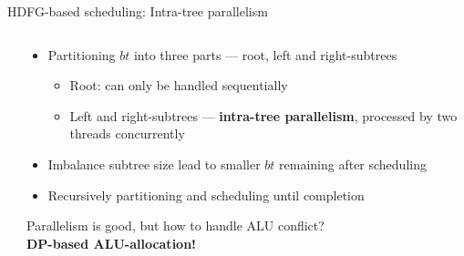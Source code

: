 \documentclass{beamer}
\begin{document}
\begin{CJK}{UTF8}{bkai}
\begin{frame}{HDFG-based scheduling: Intra-tree parallelism}
\begin{columns}
\begin{column}{0.35\textwidth}
            \end{column}
            \begin{column}{0.65\textwidth}
                \begin{itemize}
                    \item Partitioning $bt$ into three parts --- root, left and right-subtrees
                        \begin{itemize}
                            \item Root: can only be handled sequentially
                            \item Left and right-subtrees --- \textbf{intra-tree parallelism}, processed by two threads concurrently
                        \end{itemize}
                    \item Imbalance subtree size lead to smaller $bt$ remaining after scheduling
                    \item Recursively partitioning and scheduling until completion
                \end{itemize} 
                \vspace{1em} 
                Parallelism is good, but how to handle ALU conflict?\\
                \vspace{1em} 
                \centering
                \textbf{DP-based ALU-allocation!}
            \end{column}
        \end{columns}
    \end{frame}


\end{CJK}
\end{document}
